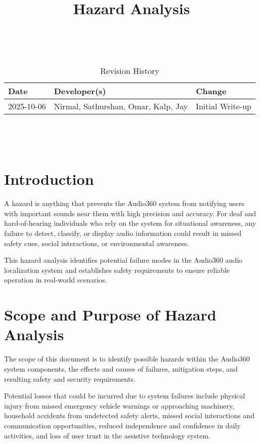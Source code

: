 \documentclass{article}
\title{Hazard Analysis\\\progname}
\author{\authname}
\date{}
\begin{document}
\maketitle
\thispagestyle{empty}

~\newpage


\begin{table}[hp]
\caption{Revision History} \label{TblRevisionHistory}
\begin{tabularx}{\textwidth}{llX}
\toprule
\textbf{Date} & \textbf{Developer(s)} & \textbf{Change}\\
\midrule
2025-10-06 &  Nirmal, Sathurshan, Omar, Kalp, Jay & Initial Write-up\\
\bottomrule
\end{tabularx}
\end{table}

~\newpage

\tableofcontents

~\newpage


\section{Introduction}

A hazard is anything that prevents the Audio360 system from notifying users with important sounds near them with high precision and accuracy. For deaf and hard-of-hearing individuals who rely on the system for situational awareness, any failure to detect, classify, or display audio information could result in missed safety cues, social interactions, or environmental awareness.

This hazard analysis identifies potential failure modes in the Audio360 audio localization system and establishes safety requirements to ensure reliable operation in real-world scenarios.

\section{Scope and Purpose of Hazard Analysis}

The scope of this document is to identify possible hazards within the Audio360 system components, the effects and causes of failures, mitigation steps, and resulting safety and security requirements.

Potential losses that could be incurred due to system failures include physical injury from missed emergency vehicle warnings or approaching machinery, household accidents from undetected safety alerts, missed social interactions and communication opportunities, reduced independence and confidence in daily activities, and loss of user trust in the assistive technology system.
\end{document}
